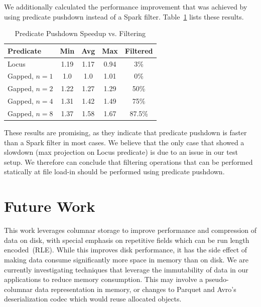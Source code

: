 \documentclass{acm_proc_article-sp}
\begin{document}
We additionally calculated the performance improvement that was achieved by using predicate pushdown instead of a Spark filter.
Table~\ref{tab:filter-vs-predicate} lists these results.

\begin{table}[h]
\caption{Predicate Pushdown Speedup vs. Filtering}
\label{tab:filter-vs-predicate}
\begin{center}
\begin{tabular}{| l | c  c c | c |}
\hline
\bf Predicate & \bf Min & \bf Avg & \bf Max & \bf Filtered \\
\hline
Locus & 1.19 & 1.17 & 0.94 & 3\% \\
Gapped, $n = 1$ & 1.0 & 1.0 & 1.01 & 0\% \\
Gapped, $n = 2$ & 1.22 & 1.27 & 1.29 & 50\% \\
Gapped, $n = 4$ & 1.31 & 1.42 & 1.49 & 75\% \\
Gapped, $n = 8$ & 1.37 & 1.58 & 1.67 & 87.5\% \\
\hline
\end{tabular}
\end{center}
\end{table}

These results are promising, as they indicate that predicate pushdown is faster than a Spark filter in most cases. We believe that the
only case that showed a slowdown (max projection on Locus predicate) is due to an issue in our test setup. We therefore can conclude
that filtering operations that can be performed statically at file load-in should be performed using predicate pushdown.

\section{Future Work}
\label{sec:future-work}

This work leverages columnar storage to improve performance and compression of data on disk,
with special emphasis on repetitive fields which can be run length encoded~(RLE). While this improves
disk performance, it has the side effect of making data consume significantly more space in memory
than on disk. We are currently investigating techniques that leverage the immutability of data in our
applications to reduce memory consumption. This may involve a pseudo-columnar data representation
in memory, or changes to Parquet and Avro's deserialization codec which would reuse allocated objects.
\end{document}
